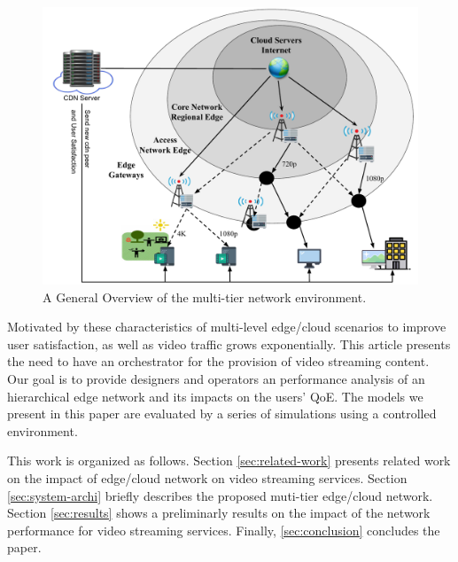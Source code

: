 \begin{figure}
    \centering
    \includegraphics[width=0.9\linewidth]{images/arch-video-content.pdf}
    \caption{A General Overview of the multi-tier network environment.}
    \label{fig:multi-tier-network}
\end{figure}

Motivated by these characteristics of multi-level edge/cloud scenarios to improve user satisfaction, as well as video traffic grows exponentially. This article presents the need to have an orchestrator for the provision of video streaming content.
Our goal is to provide designers and operators an performance analysis  of an hierarchical edge network and its impacts on the users' QoE. The models we present in this paper are evaluated by a series of simulations using a controlled environment.

This work is organized as follows.
Section \ref{sec:related-work} presents related work on the impact of edge/cloud network on video streaming services.
Section \ref{sec:system-archi} briefly describes the proposed muti-tier edge/cloud network.
Section \ref{sec:results} shows a preliminarly results on the impact of the network performance for video streaming services.
Finally, \ref{sec:conclusion} concludes the paper.